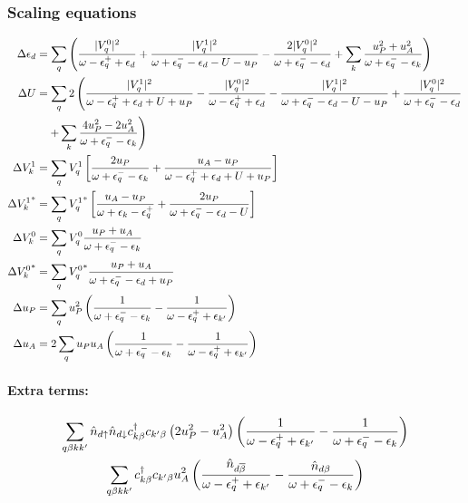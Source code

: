 \documentclass[14pt]{extarticle}
\numberwithin{equation}{section}
\begin{document}
{\subsubsection{Scaling equations}
\begin{equation}\begin{aligned}
	\Delta \epsilon_d &= \sum_q \left({\frac{|V_q^0|^2}{\omega - \epsilon_q^+ + \epsilon_d } + \frac{|V_q^1|^2}{\omega + \epsilon^-_q - \epsilon_d  - U - u_P} - \frac{2|V_q^0|^2}{\omega + \epsilon^-_q - \epsilon_d} + \sum_k\frac{u_P^2 + u_A^2}{\omega + \epsilon_q^- - \epsilon_k}}\right)\\
	\Delta U &= \sum_q 2\left(\frac{|V_q^1|^2}{\omega - \epsilon_q^+ + \epsilon_d + U + u_P} - \frac{|V_q^0|^2}{\omega - \epsilon_q^+ + \epsilon_d} - \frac{|V_q^1|^2}{\omega + \epsilon^-_q - \epsilon_d  - U - u_P} +\frac{|V_q^0|^2}{\omega + \epsilon^-_q - \epsilon_d} \right.\\
		 &\quad\left.+\sum_k \frac{4u_P^2 - 2u_A^2}{\omega + \epsilon_q^- - \epsilon_k}\right)\\
\Delta V_k^1 &=\sum_q V_q^1\left[{\frac{2u_P}{\omega + \epsilon_q^- - \epsilon_{k}} + \frac{u_A - u_P}{\omega - \epsilon_q^+ + \epsilon_d + U + u_P}}\right] \\
\Delta {V_k^1}^* &= \sum_q  {V_q^1}^*\left[{\frac{u_A - u_P}{\omega + \epsilon_k - \epsilon_q^+} + \frac{2u_P}{\omega + \epsilon_q^- - \epsilon_d - U}}\right]\\
\Delta V_k^0 &= \sum_q V_q^0\frac{u_P + u_A}{\omega + \epsilon_q^- - \epsilon_{k}}\\
\Delta {V_k^0}^* &=\sum_q {V_q^0}^* \frac{u_P + u_A}{\omega + \epsilon_q^- - \epsilon_d + u_P}\\
\Delta u_P &= \sum_qu_P^2\left({\frac{1}{\omega + \epsilon_q^-  - \epsilon_{k}} - \frac{1}{\omega - \epsilon_q^+  + \epsilon_{k^\prime}}}\right)\\
\Delta u_A &= 2 \sum_qu_P u_A \left({\frac{1}{\omega + \epsilon_q^-  - \epsilon_{k}} - \frac{1}{\omega - \epsilon_q^+  + \epsilon_{k^\prime}}}\right)\\
\end{aligned}\end{equation}
\paragraph{Extra terms:}
\begin{gather*}
	\sum_{q\beta k k^\prime}\hat n_{d\uparrow}\hat n_{d\downarrow}c^\dagger_{k\beta}c_{k^\prime\beta}\left({2u_P^2 - u_A^2}\right)\left({\frac{1}{\omega - \epsilon_q^+ + \epsilon_{k^\prime}} - \frac{1}{\omega + \epsilon_q^- - \epsilon_{k}}}\right)\\
	\sum_{q\beta k k^\prime}c^\dagger_{k\beta}c_{k^\prime\beta}u_A^2\left({\frac{\hat n_{d\overline\beta}}{\omega - \epsilon_q^+ + \epsilon_{k^\prime}} - \frac{\hat n_{d\beta}}{\omega + \epsilon_q^- - \epsilon_{k}}}\right)
\end{gather*}

}
\end{document}
